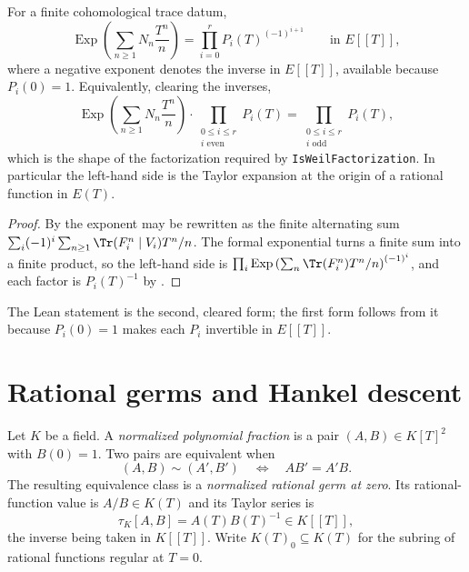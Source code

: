 \begin{proposition}
\label{prop:zla-cohomological-factorization}
\leanok
For a finite cohomological trace datum,
\[
  \operatorname{Exp}\left(\sum_{n\geq1}N_n\frac{T^n}{n}\right)
  =\prod_{i=0}^rP_i(T)^{(-1)^{i+1}}
  \qquad\text{in }E[[T]],
\]
where a negative exponent denotes the inverse in $E[[T]]$, available because
$P_i(0)=1$.  Equivalently, clearing the inverses,
\[
  \operatorname{Exp}\left(\sum_{n\geq1}N_n\frac{T^n}{n}\right)
  \cdot\prod_{\substack{0\leq i\leq r\\ i\text{ even}}}P_i(T)
  =\prod_{\substack{0\leq i\leq r\\ i\text{ odd}}}P_i(T),
\]
which is the shape of the factorization required by
\texttt{IsWeilFactorization}.  In particular the left-hand side is the Taylor
expansion at the origin of a rational function in $E(T)$.
\end{proposition}
\begin{proof}
\leanok
By  the exponent may be rewritten as the finite
alternating sum $\sum_i(-1)^i\sum_{n\geq1}\Tr(F_i^n\mid V_i)T^n/n$.  The formal
exponential turns a finite sum into a finite product, so the left-hand side is
$\prod_i\operatorname{Exp}\left(\sum_n\Tr(F_i^n)T^n/n\right)^{(-1)^i}$, and
each factor is $P_i(T)^{-1}$ by .
\end{proof}

The Lean statement is the second, cleared form; the first form follows from
it because $P_i(0)=1$ makes each $P_i$ invertible in $E[[T]]$.

\section{Rational germs and Hankel descent}\label{sec:zla-hankel}

\begin{definition}
\label{def:zla-rational-germ}
Let $K$ be a field.  A \emph{normalized polynomial fraction} is a pair
$(A,B)\in K[T]^2$ with $B(0)=1$.  Two pairs are equivalent when
\[
  (A,B)\sim(A',B')
  \quad\Longleftrightarrow\quad
  AB'=A'B.
\]
The resulting equivalence class is a \emph{normalized rational germ at zero}.
Its rational-function value is $A/B\in K(T)$ and its Taylor series is
\[
  \tau_K[A,B]=A(T)B(T)^{-1}\in K[[T]],
\]
the inverse being taken in $K[[T]]$.  Write $K(T)_0\subseteq K(T)$ for the
subring of rational functions regular at $T=0$.
\end{definition}

